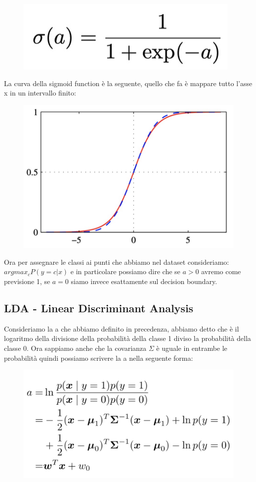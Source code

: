 \documentclass[14pt]{extreport}
\begin{document}
\begin{figure}[H]
\centering
\includegraphics[width=0.3\linewidth]{168.jpeg}
\end{figure}

La curva della sigmoid function è la seguente, quello che fa è mappare tutto l'asse x in un intervallo finito:

\begin{figure}[H]
\centering
\includegraphics[width=0.4\linewidth]{169.jpeg}
\end{figure}

Ora per assegnare le classi ai punti che abbiamo nel dataset consideriamo: $argmax_c P(y=c|x)$ e in particolare possiamo dire che se $a>0$ avremo come
previsione 1, se $a=0$ siamo invece esattamente sul decision boundary.


\subsection{LDA - Linear Discriminant Analysis}

Consideriamo la a che abbiamo definito in precedenza, abbiamo detto che è il logaritmo della  divisione della probabilità della classe 1 diviso la
probabilità della classe 0. Ora sappiamo anche che la covarianza $\Sigma$ è uguale in entrambe le probabilità quindi possiamo scrivere la a nella
seguente forma:

\begin{figure}[H]
\centering
\includegraphics[width=0.7\linewidth]{170.jpeg}
\end{figure}
\end{document}
